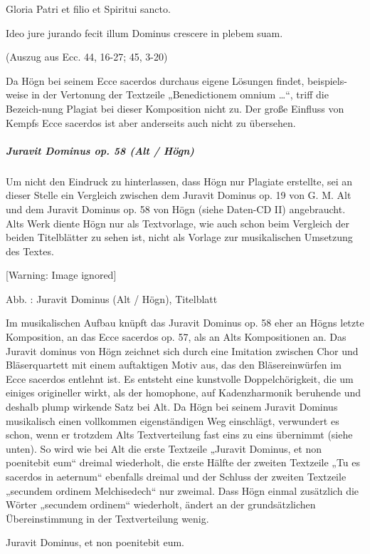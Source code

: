 \documentclass[a4paper]{article}
\newcounter{Abb}
\renewcommand\theAbb{\arabic{Abb}}
\begin{document}
Gloria Patri et filio et Spiritui sancto.

Ideo jure jurando fecit illum Dominus crescere in plebem suam.

(Auszug aus Ecc. 44, 16-27; 45, 3-20)

Da Högn bei seinem Ecce sacerdos durchaus eigene Lösungen findet,
beispiels-weise in der Vertonung der Textzeile „Benedictionem omnium
…“, triff die Bezeich-nung Plagiat bei dieser Komposition nicht zu. Der
große Einfluss von Kempfs Ecce sacerdos ist aber anderseits auch nicht
zu übersehen.  

\clearpage\subparagraph{Juravit Dominus op. 58 (Alt / Högn)}
Um nicht den Eindruck zu hinterlassen, dass Högn nur Plagiate erstellte,
sei an dieser Stelle ein Vergleich zwischen dem Juravit Dominus op. 19
von G. M. Alt und dem Juravit Dominus op. 58 von Högn (siehe Daten-CD
II) angebraucht. Alts Werk diente Högn nur als Textvorlage, wie auch
schon beim Vergleich der beiden Titelblätter zu sehen ist, nicht als
Vorlage zur musikalischen Umsetzung des Textes.

  [Warning: Image ignored] %
 

Abb. \stepcounter{Abb}{\theAbb}: Juravit Dominus (Alt / Högn),
Titelblatt

Im musikalischen Aufbau knüpft das Juravit Dominus op. 58 eher an Högns
letzte Komposition, an das Ecce sacerdos op. 57, als an Alts
Kompositionen an. Das Juravit dominus von Högn zeichnet sich durch eine
Imitation zwischen Chor und Bläserquartett mit einem auftaktigen Motiv
aus, das den Bläsereinwürfen im Ecce sacerdos entlehnt ist. Es entsteht
eine kunstvolle Doppelchörigkeit, die um einiges origineller wirkt, als
der homophone, auf Kadenzharmonik beruhende und deshalb plump wirkende
Satz bei Alt. Da Högn bei seinem Juravit Dominus musikalisch einen
vollkommen eigenständigen Weg einschlägt, verwundert es schon, wenn er
trotzdem Alts Textverteilung fast eins zu eins übernimmt (siehe unten).
So wird wie bei Alt die erste Textzeile „Juravit Dominus, et non
poenitebit eum“ dreimal wiederholt, die erste Hälfte der zweiten
Textzeile „Tu es sacerdos in aeternum“ ebenfalls dreimal und der
Schluss der zweiten Textzeile „secundem ordinem Melchisedech“ nur
zweimal. Dass Högn einmal zusätzlich die Wörter „secundem ordinem“
wiederholt, ändert an der grundsätzlichen Übereinstimmung in der
Textverteilung wenig. 

Juravit Dominus, et non poenitebit eum. 
\end{document}
